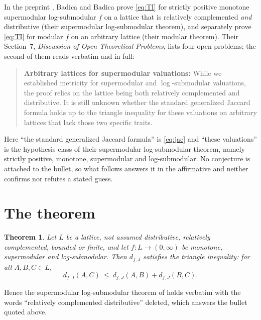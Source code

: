 \documentclass[11pt]{amsart}
\newtheorem{theorem}{Theorem}
\theoremstyle{remark}
\newcommand{\Lat}{L}
\newcommand{\dJ}{d_{f,J}}
\begin{document}
In the preprint \cite{BB}, Badica and Badica prove \eqref{eq:TI} for strictly
positive monotone supermodular log-submodular $f$ on a lattice that is
relatively complemented \emph{and} distributive (their supermodular
log-submodular theorem), and separately prove \eqref{eq:TI} for modular $f$ on
an arbitrary lattice (their modular theorem). Their Section~7, \emph{Discussion
of Open Theoretical Problems}, lists four open problems; the second of them
reads verbatim and in full:

\begin{quote}\sloppy
\textbf{Arbitrary lattices for supermodular valuations:} While we established
metricity for supermodular and $\log$-submodular valuations, the proof relies
on the lattice being both relatively complemented and distributive. It is
still unknown whether the standard generalized Jaccard formula holds up to the
triangle inequality for these valuations on arbitrary lattices that lack those
two specific traits.
\end{quote}

Here ``the standard generalized Jaccard formula'' is \eqref{eq:jac} and
``these valuations'' is the hypothesis class of their supermodular
log-submodular theorem, namely strictly positive, monotone, supermodular and
log-submodular. No conjecture is attached to the bullet, so what follows
answers it in the affirmative and neither confirms nor refutes a stated guess.

\section{The theorem}

\begin{theorem}\label{thm:main}
Let $\Lat$ be a lattice, not assumed distributive, relatively complemented,
bounded or finite, and let $f\colon\Lat\to(0,\infty)$ be monotone,
supermodular and log-submodular. Then $\dJ$ satisfies the triangle inequality: for all
$A,B,C\in \Lat$,
\[
 \dJ(A,C)\ \le\ \dJ(A,B)+\dJ(B,C).
\]
\end{theorem}

Hence the supermodular log-submodular theorem of \cite{BB} holds verbatim with
the words ``relatively complemented distributive'' deleted, which answers the
bullet quoted above.
\end{document}
